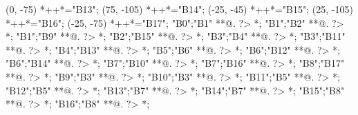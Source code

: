 \begin{scriptsize}
(0, -75)
	*++{}*\frm{-,}="B13";
(75, -105)
	*++{}*\frm{-,}="B14";
(-25, -45)
	*++{}*\frm{-,}="B15";
(25, -105)
	*++{}*\frm{-,}="B16";
(-25, -75)
	*++{}*\frm{-,}="B17";
"B0";"B1" **@{.} ?> *{\dir{>}};
"B1";"B2" **@{.} ?> *{\dir{>}};
"B1";"B9" **@{.} ?> *{\dir{>}};
"B2";"B15" **@{.} ?> *{\dir{>}};
"B3";"B4" **@{.} ?> *{\dir{>}};
"B3";"B11" **@{.} ?> *{\dir{>}};
"B4";"B13" **@{.} ?> *{\dir{>}};
"B5";"B6" **@{.} ?> *{\dir{>}};
"B6";"B12" **@{.} ?> *{\dir{>}};
"B6";"B14" **@{.} ?> *{\dir{>}};
"B7";"B10" **@{.} ?> *{\dir{>}};
"B7";"B16" **@{.} ?> *{\dir{>}};
"B8";"B17" **@{.} ?> *{\dir{>}};
"B9";"B3" **@{.} ?> *{\dir{>}};
"B10";"B3" **@{.} ?> *{\dir{>}};
"B11";"B5" **@{.} ?> *{\dir{>}};
"B12";"B5" **@{.} ?> *{\dir{>}};
"B13";"B7" **@{.} ?> *{\dir{>}};
"B14";"B7" **@{.} ?> *{\dir{>}};
"B15";"B8" **@{.} ?> *{\dir{>}};
"B16";"B8" **@{.} ?> *{\dir{>}};
\endxy
\end{scriptsize}


